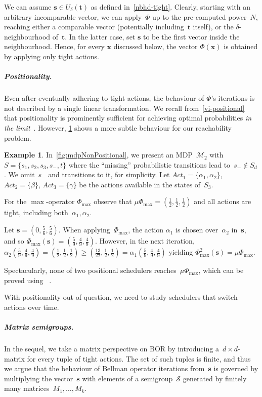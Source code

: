 \documentclass[preprint,12pt]{elsarticle}
\theoremstyle{plain}
\theoremstyle{definition}
\newtheorem{example}[theorem]{Example}
\theoremstyle{remark}
\theoremstyle{claimstyle}
\newcommand{\mdp}{\mathcal{M}}
\begin{document}
We can assume $\bm{s} \in U_\delta(\bm{t})$ as defined in~\cref{nbhd-tight}.
Clearly, starting with an arbitrary incomparable vector, we can apply~$\Phi$ up to the pre-computed power~$N$,
reaching either a comparable vector (potentially including~$\bm{t}$ itself), or the $\delta$-neighbourhood of~$\bm{t}$.
In the latter case, set $\bm{s}$ to be the first vector inside the neighbourhood.
Hence, for every $\bm{x}$ discussed below, the vector $\Phi(\bm{x})$ is obtained by applying only tight actions.
\subparagraph*{Positionality.}
Even after eventually adhering to tight actions, the behaviour of $\Phi$'s iterations is not described by a single linear transformation.
We recall from~\cref{vi-positional} that positionality is prominently sufficient for achieving optimal probabilities \emph{in the limit}~\cite{bk}.
However, \cref{ex:3d} shows a more subtle behaviour for our reachability problem.
\begin{example}\label{ex:3d}
In~\cref{fig:mdpNonPositional}, we present an MDP~$\mdp_2$ with~$S = \{s_1, s_2, s_3, s_{-}, t\}$ where the ``missing'' probabilistic transitions lead to~$s_{-} \not \in S_d$.
We omit~$s_{-}$ and transitions to it, for simplicity.
Let $Act_1 = \{\alpha_1, \alpha_2\}$, $Act_2 = \{\beta\}$, $Act_3 = \{\gamma\}$ be the actions available in the states of~$S_3$.

For the $\max$-operator $\Phi_{\max}$ observe that $\mu\Phi_{\max} = (\frac{1}{2},\frac{1}{2},\frac{1}{2})$ and all actions are tight, including both~$\alpha_1,\alpha_2$.

Let $\bm{s} = (0,\frac{5}{6},\frac{5}{6})$.
When applying~$\Phi_{\max}$, the action $\alpha_1$ is chosen over~$\alpha_2$ in~$\bm{s}$, and so
$\Phi_{\max}(\bm{s}) = (\frac{5}{9}, \frac{4}{9}, \frac{4}{9})$.
However, in the next iteration, $\alpha_2(\frac{5}{9}, \frac{4}{9}, \frac{4}{9}) = (\frac{1}{2},\frac{1}{2},\frac{1}{2}) \geq 
(\frac{13}{27},\frac{1}{2},\frac{1}{2})=  \alpha_1(\frac{5}{9}, \frac{4}{9}, \frac{4}{9})$ yielding
$\Phi^2_{\max}(\bm{s}) = \mu\Phi_{\max}$.

Spectacularly, none of two positional schedulers reaches~$\mu\Phi_{\max}$, 
which can be proved using%
~\cite{kannan1986poly}.
\end{example}
With positionality out of question, 
we need to study schedulers that switch actions over time.
\subparagraph*{Matrix semigroups.}
In the sequel, we take a matrix perspective on BOR
by introducing a~$d\times d$-matrix for every tuple of tight actions.
The set of such tuples is finite, and thus we argue that the behaviour of
Bellman operator iterations from~$\bm{s}$ is governed by multiplying the vector~$\bm{s}$ with elements of a semigroup~$\mathcal{S}$ generated by finitely many matrices~$M_1, \dots, M_k$.
\end{document}
